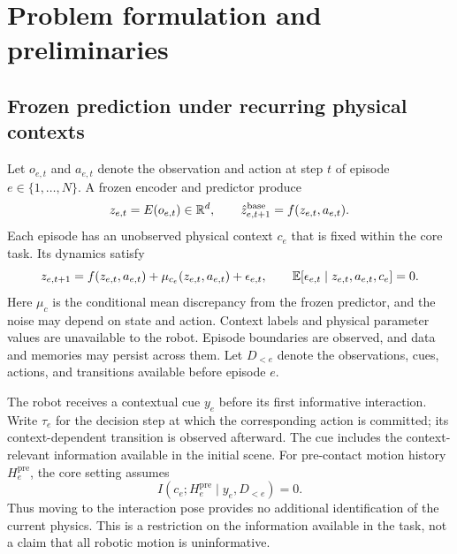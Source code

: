 \section{Problem formulation and preliminaries}\label{sec:problem}
\subsection{Frozen prediction under recurring physical contexts}
Let $o_{e,t}$ and $a_{e,t}$ denote the observation and action at step $t$ of episode $e\in\{1,\ldots,N\}$. A frozen encoder and predictor produce
\begin{equation}
z_{e,t}=E(o_{e,t})\in\mathbb{R}^d,
\qquad \hat z^{\mathrm{base}}_{e,t+1}=f(z_{e,t},a_{e,t}).
\end{equation}
Each episode has an unobserved physical context $c_e$ that is fixed within the core task. Its dynamics satisfy
\begin{equation}\label{eq:dynamics}
z_{e,t+1}=f(z_{e,t},a_{e,t})+\mu_{c_e}(z_{e,t},a_{e,t})+\epsilon_{e,t},
\qquad \mathbb{E}[\epsilon_{e,t}\mid z_{e,t},a_{e,t},c_e]=0.
\end{equation}
Here $\mu_c$ is the conditional mean discrepancy from the frozen predictor, and the noise may depend on state and action. Context labels and physical parameter values are unavailable to the robot. Episode boundaries are observed, and data and memories may persist across them. Let $D_{<e}$ denote the observations, cues, actions, and transitions available before episode $e$.

The robot receives a contextual cue $y_e$ before its first informative interaction. Write $\tau_e$ for the decision step at which the corresponding action is committed; its context-dependent transition is observed afterward. The cue includes the context-relevant information available in the initial scene. For pre-contact motion history $H^{\mathrm{pre}}_e$, the core setting assumes
\begin{equation}\label{eq:noinfo}
I(c_e;H^{\mathrm{pre}}_e\mid y_e,D_{<e})=0.
\end{equation}
Thus moving to the interaction pose provides no additional identification of the current physics. This is a restriction on the information available in the task, not a claim that all robotic motion is uninformative.

